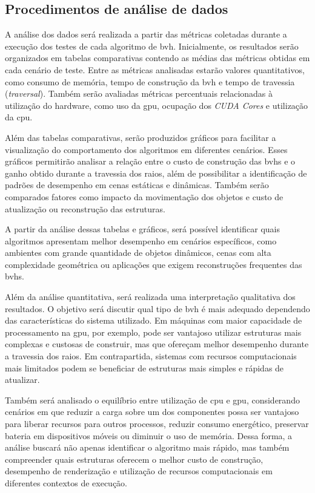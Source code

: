 \subsection{Procedimentos de análise de dados}

A análise dos dados será realizada a partir das métricas coletadas durante a execução dos testes de cada algoritmo de \gls{bvh}. Inicialmente, os resultados serão organizados em tabelas comparativas contendo as médias das métricas obtidas em cada cenário de teste. Entre as métricas analisadas estarão valores quantitativos, como consumo de memória, tempo de construção da \gls{bvh} e tempo de travessia (\textit{traversal}). Também serão avaliadas métricas percentuais relacionadas à utilização do hardware, como uso da \gls{gpu}, ocupação dos \textit{CUDA Cores} e utilização da \gls{cpu}.

Além das tabelas comparativas, serão produzidos gráficos para facilitar a visualização do comportamento dos algoritmos em diferentes cenários. Esses gráficos permitirão analisar a relação entre o custo de construção das \glspl{bvh} e o ganho obtido durante a travessia dos raios, além de possibilitar a identificação de padrões de desempenho em cenas estáticas e dinâmicas. Também serão comparados fatores como impacto da movimentação dos objetos e custo de atualização ou reconstrução das estruturas.

A partir da análise dessas tabelas e gráficos, será possível identificar quais algoritmos apresentam melhor desempenho em cenários específicos, como ambientes com grande quantidade de objetos dinâmicos, cenas com alta complexidade geométrica ou aplicações que exigem reconstruções frequentes das \glspl{bvh}.

Além da análise quantitativa, será realizada uma interpretação qualitativa dos resultados. O objetivo será discutir qual tipo de \gls{bvh} é mais adequado dependendo das características do sistema utilizado. Em máquinas com maior capacidade de processamento na \gls{gpu}, por exemplo, pode ser vantajoso utilizar estruturas mais complexas e custosas de construir, mas que ofereçam melhor desempenho durante a travessia dos raios. Em contrapartida, sistemas com recursos computacionais mais limitados podem se beneficiar de estruturas mais simples e rápidas de atualizar.

Também será analisado o equilíbrio entre utilização de \gls{cpu} e \gls{gpu}, considerando cenários em que reduzir a carga sobre um dos componentes possa ser vantajoso para liberar recursos para outros processos, reduzir consumo energético, preservar bateria em dispositivos móveis ou diminuir o uso de memória. Dessa forma, a análise buscará não apenas identificar o algoritmo mais rápido, mas também compreender quais estruturas oferecem o melhor custo de construção, desempenho de renderização e utilização de recursos computacionais em diferentes contextos de execução.


